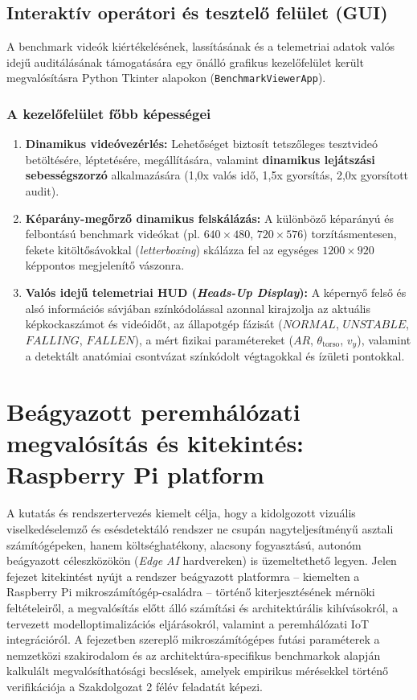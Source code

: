 \documentclass[12pt,a4paper,oneside]{report}
\begin{document}
\section{Interaktív operátori és tesztelő felület (GUI)}
A benchmark videók kiértékelésének, lassításának és a telemetriai adatok valós idejű auditálásának támogatására egy önálló grafikus kezelőfelület került megvalósításra Python Tkinter alapokon (\texttt{BenchmarkViewerApp}).

\subsection{A kezelőfelület főbb képességei}
\begin{enumerate}
    \item \textbf{Dinamikus videóvezérlés:} Lehetőséget biztosít tetszőleges tesztvideó betöltésére, léptetésére, megállítására, valamint \textbf{dinamikus lejátszási sebességszorzó} alkalmazására (1,0x valós idő, 1,5x gyorsítás, 2,0x gyorsított audit).
    \item \textbf{Képarány-megőrző dinamikus felskálázás:} A különböző képarányú és felbontású benchmark videókat (pl. $640 \times 480$, $720 \times 576$) torzításmentesen, fekete kitöltősávokkal (\textit{letterboxing}) skálázza fel az egységes $1200 \times 920$ képpontos megjelenítő vászonra.
    \item \textbf{Valós idejű telemetriai HUD (\textit{Heads-Up Display}):} A képernyő felső és alsó információs sávjában színkódolással azonnal kirajzolja az aktuális képkockaszámot és videóidőt, az állapotgép fázisát ($NORMAL$, $UNSTABLE$, $FALLING$, $FALLEN$), a mért fizikai paramétereket ($AR$, $\theta_{\text{torso}}$, $v_y$), valamint a detektált anatómiai csontvázat színkódolt végtagokkal és ízületi pontokkal.
\end{enumerate}


\chapter{Beágyazott peremhálózati megvalósítás és kitekintés: Raspberry Pi platform}

A kutatás és rendszertervezés kiemelt célja, hogy a kidolgozott vizuális viselkedéselemző és esésdetektáló rendszer ne csupán nagyteljesítményű asztali számítógépeken, hanem költséghatékony, alacsony fogyasztású, autonóm beágyazott céleszközökön (\textit{Edge AI} hardvereken) is üzemeltethető legyen. Jelen fejezet kitekintést nyújt a rendszer beágyazott platformra -- kiemelten a Raspberry Pi mikroszámítógép-családra -- történő kiterjesztésének mérnöki feltételeiről, a megvalósítás előtt álló számítási és architektúrális kihívásokról, a tervezett modelloptimalizációs eljárásokról, valamint a peremhálózati IoT integrációról. A fejezetben szereplő mikroszámítógépes futási paraméterek a nemzetközi szakirodalom és az architektúra-specifikus benchmarkok alapján kalkulált megvalósíthatósági becslések, amelyek empirikus mérésekkel történő verifikációja a Szakdolgozat 2 félév feladatát képezi.
\end{document}
